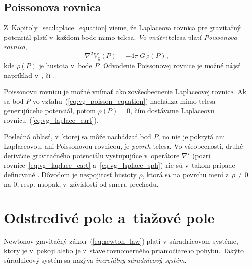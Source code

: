 \documentclass[a4paper,12pt]{book}
\newcommand{\gidx}{\mathrm g}
\begin{document}
\subsection{Poissonova rovnica}
\label{sec:poisson_equation}

Z~Kapitoly~\ref{sec:laplace_equation} vieme, že Laplaceova rovnica pre
gravitačný potenciál platí v~každom bode mimo telesa.  \emph{Vo vnútri} telesa
platí \emph{Poissonova rovnica},
%
\begin{equation}
\label{eq:vg_poisson_equation}
\nabla^2 V_\gidx(P) = -4 \pi \, G \, \rho(P){,}
\end{equation}
%
kde $\rho(P)$ je hustota v~bode $P$.  Odvodenie Poissonovej rovnice je možné
nájsť napríklad v~\textcite{MacMillan1930}, \textcite{Kellogg1967} či
\textcite{SansoGeoidDetermination}.

Poissonovu rovnicu je možné vnímať ako zovšeobecnenie Laplaceovej rovnice.  Ak
sa bod $P$ vo vzťahu~(\ref{eq:vg_poisson_equation}) nachádza mimo telesa
generujúceho potenciál, potom $\rho(P) = 0$, čím dostávame Laplaceovu
rovnicu~(\ref{eq:vg_laplace_cart}).

Posledná oblasť, v~ktorej sa môže nachádzať bod $P$, no nie je pokrytá ani 
Laplaceovou, ani Poissonovou rovnicou, je \emph{povrch} telesa.  Vo 
všeobecnosti, druhé derivácie gravitačného potenciálu vystupujúce v~operátore 
$\nabla^2$ (pozri rovnice~\ref{eq:vg_laplace_cart} a~\ref{eq:vg_laplace_sph}) 
nie sú v~takom prípade definované \parencite{Kellogg1967}.  Dôvodom je 
nespojitosť hustoty $\rho$, ktorá sa na povrchu mení z~$\rho \neq 0$ na 0, 
resp. naopak, v~závislosti od smeru prechodu.






\section{Odstredivé pole a~tiažové pole}
\label{sec:centrifugal_gravity_field}

Newtonov gravitačný zákon~(\ref{eq:newton_law}) platí v~súradnicovom systéme,
ktorý je v~pokoji alebo je v~stave rovnomerného priamočiareho pohybu.  Takýto
súradnicový systém sa nazýva \emph{inerciálny súradnicový systém}.
\end{document}
